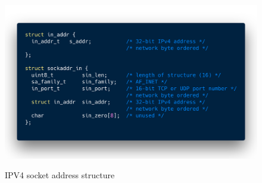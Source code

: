   \begin{figure}
  \centering
  \includegraphics[width=.8\textwidth]{code/02code01.png}\\
  \caption{IPV4 socket address structure}
  \label{1}
  \end{figure}
